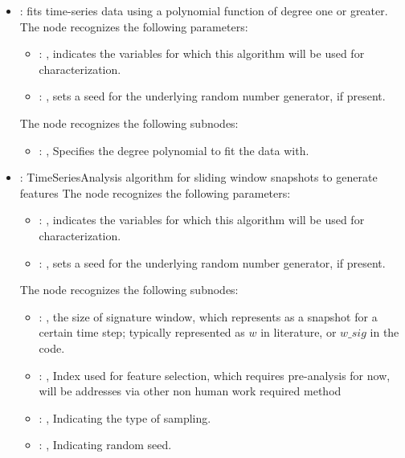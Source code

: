 \begin{itemize}
    \item {}:
      fits time-series data using a polynomial function of degree one or greater.
      The  node recognizes the following parameters:
        \begin{itemize}
          \item {}: , 
            indicates the variables for which this algorithm will be used for characterization.
          \item {}: , 
            sets a seed for the underlying random number generator, if present.
      \end{itemize}

      The  node recognizes the following subnodes:
      \begin{itemize}
        \item {}: , 
          Specifies the degree polynomial to fit the data with.
      \end{itemize}

    \item {}:
      TimeSeriesAnalysis algorithm for sliding window snapshots to generate features
      The  node recognizes the following parameters:
        \begin{itemize}
          \item {}: , 
            indicates the variables for which this algorithm will be used for characterization.
          \item {}: , 
            sets a seed for the underlying random number generator, if present.
      \end{itemize}

      The  node recognizes the following subnodes:
      \begin{itemize}
        \item {}: , 
          the size of signature window, which represents as a snapshot for a certain time step;
          typically represented as $w$ in literature, or $w\_sig$ in the code.

        \item {}: , 
          Index used for feature selection, which requires pre-analysis for now, will be addresses
          via other non human work required method

        \item {}: , 
          Indicating the type of sampling.

        \item {}: , 
          Indicating random seed.
      \end{itemize}
  \end{itemize}

